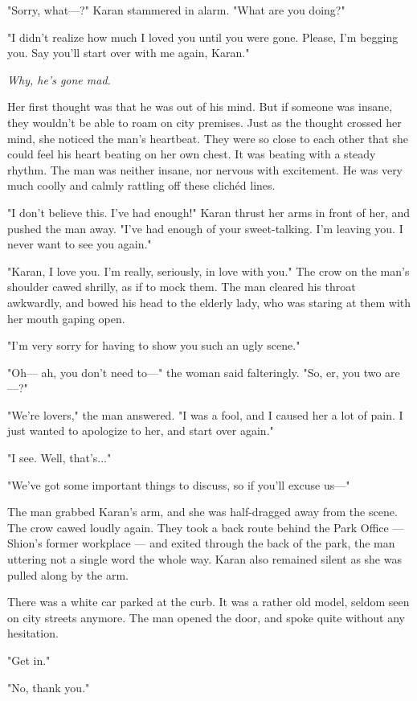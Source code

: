"Sorry, what---?" Karan stammered in alarm. "What are you doing?"

"I didn't realize how much I loved you until you were gone. Please, I'm
begging you. Say you'll start over with me again, Karan."

\emph{Why, he's gone mad.}

Her first thought was that he was out of his mind. But if someone was
insane, they wouldn't be able to roam on city premises. Just as the
thought crossed her mind, she noticed the man's heartbeat. They were so
close to each other that she could feel his heart beating on her own
chest. It was beating with a steady rhythm. The man was neither insane,
nor nervous with excitement. He was very much coolly and calmly rattling
off these clichéd lines.

"I don't believe this. I've had enough!" Karan thrust her arms in front
of her, and pushed the man away. "I've had enough of your sweet-talking.
I'm leaving you. I never want to see you again."

"Karan, I love you. I'm really, seriously, in love with you." The crow
on the man's shoulder cawed shrilly, as if to mock them. The man cleared
his throat awkwardly, and bowed his head to the elderly lady, who was
staring at them with her mouth gaping open.

"I'm very sorry for having to show you such an ugly scene."

"Oh--- ah, you don't need to---" the woman said falteringly. "So, er, you
two are---?"

"We're lovers," the man answered. "I was a fool, and I caused her a lot
of pain. I just wanted to apologize to her, and start over again."

"I see. Well, that's..."

"We've got some important things to discuss, so if you'll excuse us---"

The man grabbed Karan's arm, and she was half-dragged away from the
scene. The crow cawed loudly again. They took a back route behind the
Park Office --- Shion's former workplace --- and exited through the back of
the park, the man uttering not a single word the whole way. Karan also
remained silent as she was pulled along by the arm.

There was a white car parked at the curb. It was a rather old model,
seldom seen on city streets anymore. The man opened the door, and spoke
quite without any hesitation.

"Get in."

"No, thank you."

